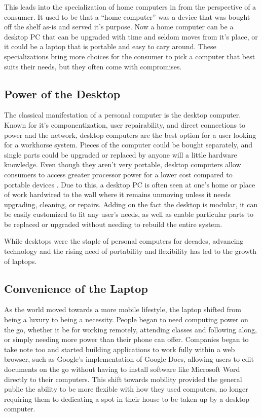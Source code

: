 This leads into the specialization of home computers in from the perspective of a consumer.
It used to be that a \enquote{home computer} was a device that was bought off the shelf as-is and served it's purpose.
Now a home computer can be a desktop PC that can be upgraded with time and seldom moves from it's place, or it could be a laptop that is portable and easy to cary around.
These specializations bring more choices for the consumer to pick a computer that best suits their needs, but they often come with compromises.

\subsection{Power of the Desktop}\label{PowerOfTheDesktop}

The classical manifestation of a personal computer is the desktop computer.
Known for it's componentization, user repairability, and direct connections to power and the network, desktop computers are the best option for a user looking for a workhorse system.
Pieces of the computer could be bought separately, and single parts could be upgraded or replaced by anyone will a little hardware knowledge.
Even though they aren't very portable, desktop computers allow consumers to access greater processor power for a lower cost compared to portable devices \citep{Meyer20145RS}.
Due to this, a desktop PC is often seen at one's home or place of work hardwired to the wall where it remains unmoving unless it needs upgrading, cleaning, or repairs.
Adding on the fact the desktop is modular, it can be easily customized to fit any user's needs, as well as enable particular parts to be replaced or upgraded without needing to rebuild the entire system.

While desktops were the staple of personal computers for decades, advancing technology and the rising need of portability and flexibility has led to the growth of laptops.


\subsection{Convenience of the Laptop}\label{ConvenienceOfTheLaptop}

As the world moved towards a more mobile lifestyle, the laptop shifted from being a luxury to being a necessity.
People began to need computing power on the go, whether it be for working remotely, attending classes and following along, or simply needing more power than their phone can offer.
Companies began to take note too and started building applications to work fully within a web browser, such as Google's implementation of Google Docs, allowing users to edit documents on the go without having to install software like Microsoft Word directly to their computers.
This shift towards mobility provided the general public the ability to be more flexible with how they used computers, no longer requiring them to dedicating a spot in their house to be taken up by a desktop computer.

